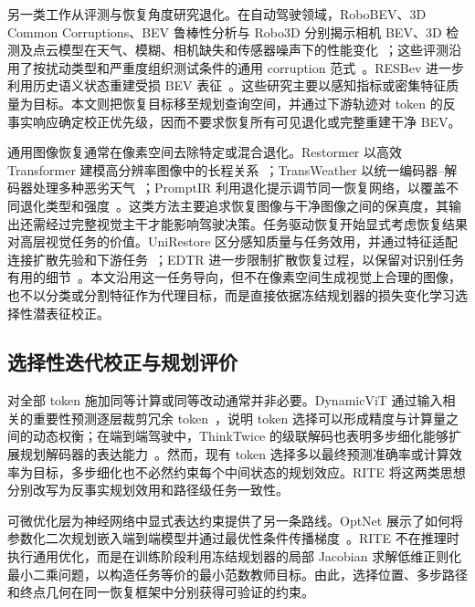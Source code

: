 \documentclass[letterpaper,10pt,conference]{ieeeconf}
\begin{document}
另一类工作从评测与恢复角度研究退化。在自动驾驶领域，RoboBEV、3D Common Corruptions、BEV 鲁棒性分析与 Robo3D 分别揭示相机 BEV、3D 检测及点云模型在天气、模糊、相机缺失和传感器噪声下的性能变化~\cite{xie2023robobev,dong2023commoncorruptions,zhu2023bevrobustness,kong2023robo3d}；这些评测沿用了按扰动类型和严重度组织测试条件的通用 corruption 范式~\cite{hendrycks2019corruptions}。RESBev 进一步利用历史语义状态重建受损 BEV 表征~\cite{zhuo2026resbev}。这些研究主要以感知指标或密集特征质量为目标。本文则把恢复目标移至规划查询空间，并通过下游轨迹对 token 的反事实响应确定校正优先级，因而不要求恢复所有可见退化或完整重建干净 BEV。

通用图像恢复通常在像素空间去除特定或混合退化。Restormer 以高效 Transformer 建模高分辨率图像中的长程关系~\cite{zamir2022restormer}；TransWeather 以统一编码器--解码器处理多种恶劣天气~\cite{valanarasu2022transweather}；PromptIR 利用退化提示调节同一恢复网络，以覆盖不同退化类型和强度~\cite{potlapalli2023promptir}。这类方法主要追求恢复图像与干净图像之间的保真度，其输出还需经过完整视觉主干才能影响驾驶决策。任务驱动恢复开始显式考虑恢复结果对高层视觉任务的价值。UniRestore 区分感知质量与任务效用，并通过特征适配连接扩散先验和下游任务~\cite{chen2025unirestore}；EDTR 进一步限制扩散恢复过程，以保留对识别任务有用的细节~\cite{kim2025edtr}。本文沿用这一任务导向，但不在像素空间生成视觉上合理的图像，也不以分类或分割特征作为代理目标，而是直接依据冻结规划器的损失变化学习选择性潜表征校正。

\subsection{选择性迭代校正与规划评价}

对全部 token 施加同等计算或同等改动通常并非必要。DynamicViT 通过输入相关的重要性预测逐层裁剪冗余 token~\cite{rao2021dynamicvit}，说明 token 选择可以形成精度与计算量之间的动态权衡；在端到端驾驶中，ThinkTwice 的级联解码也表明多步细化能够扩展规划解码器的表达能力~\cite{jia2023thinktwice}。然而，现有 token 选择多以最终预测准确率或计算效率为目标，多步细化也不必然约束每个中间状态的规划效应。RITE 将这两类思想分别改写为反事实规划效用和路径级任务一致性。

可微优化层为神经网络中显式表达约束提供了另一条路线。OptNet 展示了如何将参数化二次规划嵌入端到端模型并通过最优性条件传播梯度~\cite{amos2017optnet}。RITE 不在推理时执行通用优化，而是在训练阶段利用冻结规划器的局部 Jacobian 求解低维正则化最小二乘问题，以构造任务等价的最小范数教师目标。由此，选择位置、多步路径和终点几何在同一恢复框架中分别获得可验证的约束。
\end{document}

